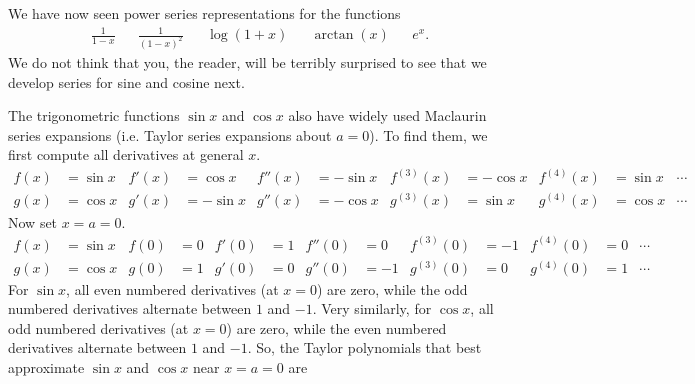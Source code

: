 We have now seen power series representations for the functions
\begin{align*}
  \frac{1}{1-x} && \frac{1}{(1-x)^2} && \log(1+x) && \arctan(x) && e^x.
\end{align*}
We do not think that you, the reader, will be terribly surprised to see
that we develop series for sine and cosine next.

\begin{eg}\label{eg:sincosSeries}
The trigonometric functions $\sin x$ and $\cos x$ also have widely used
Maclaurin series expansions (i.e. Taylor series expansions about $a=0$).
To find them, we first compute all derivatives at general $x$.
\begin{equation*}%
\begin{aligned}
f(x)&=\sin x &
f'(x)&=\cos x &
f''(x)&=-\sin x &
f^{(3)}(x)&=-\cos x &
f^{(4)}(x)&=\sin x & \cdots\\
g(x)&=\cos x &
g'(x)&=-\sin x &
g''(x)&=-\cos x &
g^{(3)}(x)&=\sin x &
g^{(4)}(x)&=\cos x & \cdots
\end{aligned}
\end{equation*}
%
Now set $x=a=0$.
\begin{equation*}%
\begin{aligned}
f(x)&=\sin x &
f(0)&=0 &
f'(0)&=1 &
f''(0)&=0 &
f^{(3)}(0)&=-1 &
f^{(4)}(0)&=0 & \cdots\\
g(x)&=\cos x &
g(0)&=1 &
g'(0)&=0 &
g''(0)&=-1 &
g^{(3)}(0)&=0 &
g^{(4)}(0)&=1 & \cdots
\end{aligned}
\end{equation*}
For $\sin x$, all even numbered derivatives (at $x=0$) are zero,
while the odd numbered derivatives alternate between $1$ and $-1$.
Very similarly, for $\cos x$, all odd numbered derivatives (at $x=0$) are zero,
while the even numbered derivatives alternate between $1$ and $-1$.
So, the Taylor polynomials that best approximate $\sin x$ and $\cos x$
near $x=a=0$ are

\end{eg}
